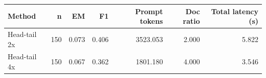 \begin{tabular}{lrrrrrr}
\toprule
Method & n & EM & F1 & Prompt tokens & Doc ratio & Total latency (s) \\
\midrule
Head-tail 2x & 150 & 0.073 & 0.406 & 3523.053 & 2.000 & 5.822 \\
Head-tail 4x & 150 & 0.067 & 0.362 & 1801.180 & 4.000 & 3.546 \\
\bottomrule
\end{tabular}
